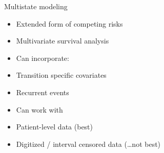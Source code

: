 \documentclass[ignorenonframetext,]{beamer}
\begin{document}
\begin{frame}{Multistate modeling}

\begin{itemize}
\item
  Extended form of competing risks
\item
  Multivariate survival analysis
\item
  Can incorporate:
\item
  Transition specific covariates
\item
  Recurrent events
\item
  Can work with
\item
  Patient-level data (best)
\item
  Digitized / interval censored data (\ldots{}not best)
\end{itemize}

\end{frame}
\end{document}
